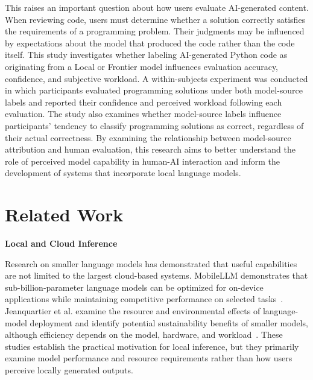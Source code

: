 \documentclass[manuscript,review]{acmart}
\begin{document}
This raises an important question about how users evaluate AI-generated content. When reviewing code, users must determine whether a solution correctly satisfies the requirements of a programming problem. Their judgments may be influenced by expectations about the model that produced the code rather than the code itself. This study investigates whether labeling AI-generated Python code as originating from a Local or Frontier model influences evaluation accuracy, confidence, and subjective workload. A within-subjects experiment was conducted in which participants evaluated programming solutions under both model-source labels and reported their confidence and perceived workload following each evaluation. The study also examines whether model-source labels influence participants' tendency to classify programming solutions as correct, regardless of their actual correctness. By examining the relationship between model-source attribution and human evaluation, this research aims to better understand the role of perceived model capability in human-AI interaction and inform the development of systems that incorporate local language models.



\section{Related Work}
\noindent\textbf{Local and Cloud Inference}\par
\noindent Research on smaller language models has demonstrated that useful capabilities are not limited to the largest cloud-based systems. MobileLLM demonstrates that sub-billion-parameter language models can be optimized for on-device applications while maintaining competitive performance on selected tasks~\cite{liu2024mobilellm}. Jeanquartier et al. examine the resource and environmental effects of language-model deployment and identify potential sustainability benefits of smaller models, although efficiency depends on the model, hardware, and workload~\cite{jeanquartier2026carbon}. These studies establish the practical motivation for local inference, but they primarily examine model performance and resource requirements rather than how users perceive locally generated outputs.
\end{document}
